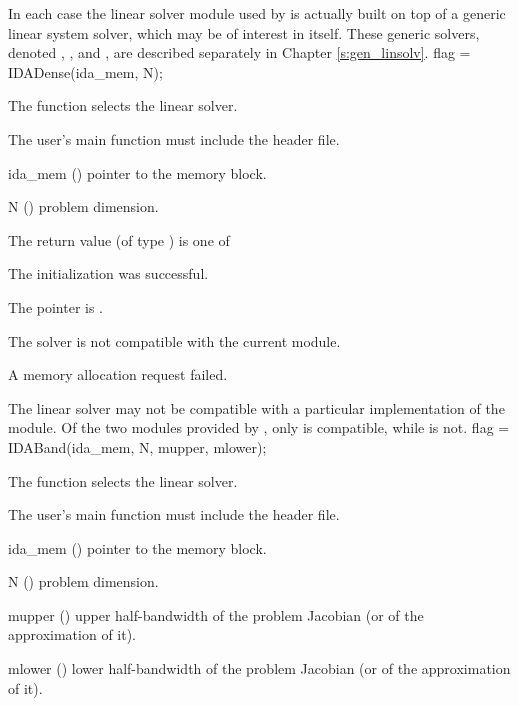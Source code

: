 In each case the linear
solver module used by {\ida} is actually built on top of a generic
linear system solver, which may be of interest in itself.  These
generic solvers, denoted {\dense}, {\band}, and {\spgmr}, are described
separately in Chapter \ref{s:gen_linsolv}.
{
  flag = IDADense(ida\_mem, N);
}
{
  The function  selects the {\idadense} linear solver. 

  The user's main function must include the  header file.
}
{
  \begin{args}
  \item[ida\_mem] ()
    pointer to the {\ida} memory block.
  \item[N] ()
    problem dimension.
  \end{args}
}
{
  The return value  (of type ) is one of
  \begin{args}
  \item[\Id{IDADENSE\_SUCCESS}] 
    The {\idadense} initialization was successful.
  \item[\Id{IDADENSE\_MEM\_NULL}]
    The  pointer is .
  \item[\Id{IDADENSE\_ILL\_INPUT}]
    The {\idadense} solver is not compatible with the current {\nvector} module.
  \item[\Id{IDADENSE\_MEM\_FAIL}]
    A memory allocation request failed.
  \end{args}
}
{
  The {\idadense} linear solver may not be compatible with a particular
  implementation of the {\nvector} module. 
  Of the two {\nvector} modules provided by {\sundials}, only {\nvecs} is 
  compatible, while {\nvecp} is not.
}
{
  flag = IDABand(ida\_mem, N, mupper, mlower);
}
{
  The function  selects the {\idaband} linear solver. 

  The user's main function must include the  header file.
}
{
  \begin{args}
  \item[ida\_mem] ()
    pointer to the {\ida} memory block.
  \item[N] ()
    problem dimension.
  \item[mupper] ()
    upper half-bandwidth of the problem Jacobian (or of the approximation of it).
  \item[mlower] ()
    lower half-bandwidth of the problem Jacobian (or of the approximation of it).
  \end{args}
}
